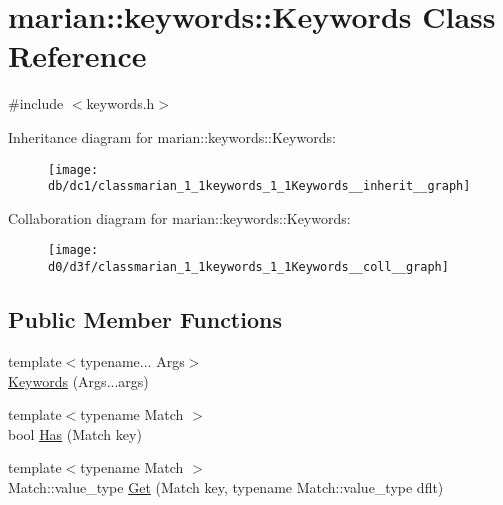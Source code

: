 \hypertarget{classmarian_1_1keywords_1_1Keywords}{}\section{marian\+:\+:keywords\+:\+:Keywords Class Reference}
\label{classmarian_1_1keywords_1_1Keywords}


{\ttfamily \#include $<$keywords.\+h$>$}



Inheritance diagram for marian\+:\+:keywords\+:\+:Keywords\+:
\nopagebreak
\begin{figure}[H]
\begin{center}
\leavevmode
\texttt{[image: db/dc1/classmarian\_1\_1keywords\_1\_1Keywords\_\_inherit\_\_graph]}
\end{center}
\end{figure}


Collaboration diagram for marian\+:\+:keywords\+:\+:Keywords\+:
\nopagebreak
\begin{figure}[H]
\begin{center}
\leavevmode
\texttt{[image: d0/d3f/classmarian\_1\_1keywords\_1\_1Keywords\_\_coll\_\_graph]}
\end{center}
\end{figure}
\subsection*{Public Member Functions}
\begin{DoxyCompactItemize}
\item 
{\footnotesize template$<$typename... Args$>$ }\\\hyperlink{classmarian_1_1keywords_1_1Keywords_a7a0535a25f392cf82e3419dce9eb52db}{Keywords} (Args...\+args)
\item 
{\footnotesize template$<$typename Match $>$ }\\bool \hyperlink{classmarian_1_1keywords_1_1Keywords_a09055f1903a6dcfe6a34e154df99a21d}{Has} (Match key)
\item 
{\footnotesize template$<$typename Match $>$ }\\Match\+::value\+\_\+type \hyperlink{classmarian_1_1keywords_1_1Keywords_ab9d8d0291a01f46f182d35c1b97bffe5}{Get} (Match key, typename Match\+::value\+\_\+type dflt)
\end{DoxyCompactItemize}
